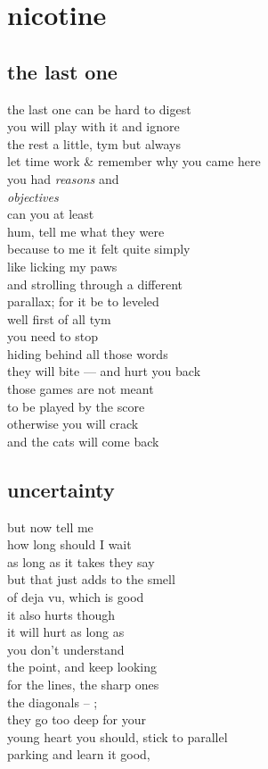 \documentclass{article}
\begin{document}
\section{nicotine}
\subsection{the last one}

the last one can be hard to digest\\
you will play with it  and ignore\\
the rest a little, tym but always\\
let time work \& remember why you came here\\
you had \textit{reasons} and\\
\textit{objectives}\\

can you at least\\
hum, tell me what they were\\
because to me it felt quite simply\\
like licking my paws\\
and strolling through a different\\
parallax; for it be to leveled\\

well first of all tym\\
you need to stop\\
hiding behind all those words\\
they will bite --- and hurt you back\\
those games are not meant\\
to be played by the score\\
otherwise you will crack\\
and the cats will come back
\clearpage
\subsection{uncertainty}

but now tell me\\
how long should I wait\\
as long as it takes they say\\
but that just adds to the smell\\
of deja vu, which is good\\
it also hurts though\\

it will hurt as long as\\
you don't understand\\
the point, and keep looking\\
for the lines, the sharp ones\\
the diagonals -- ;\\
they go too deep for your\\
young heart you should, stick to parallel\\
parking and learn it good,\\
\end{document}
